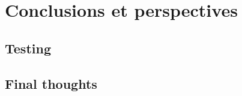 %
\chapter{Conclusions et perspectives}
\label{sec:conclusion}



\section{Testing}
\label{sec:conclusion:testing}


\section{Final thoughts}
\label{sec:conclusion:final-thoughts}

